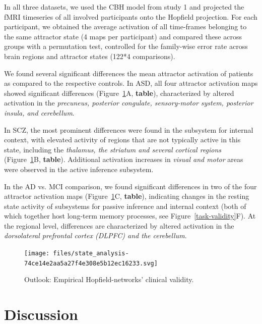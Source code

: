 \documentclass{article}
\begin{document}
In all three datasets, we used the CBH model from study 1 and projected the fMRI timeseries of all involved participants onto the Hopfield projection. For each participant, we obtained the average activation of all time-frames belonging to the same attractor state (4 maps per participant) and compared these across groups with a permutation test, controlled for the family-wise error rate across brain regions and attractor states (122*4 comparisons).

We found several significant differences the mean attractor activation of patients as compared to the respective controls. In ASD, all four attractor activation maps showed significant differences (Figure~\ref{clinical-validity}A, \textbf{table}), characterized by altered activation in the \textit{precuneus, posterior congulate, sensory-motor system, posterior insula, and cerebellum}.

In SCZ, the most prominent differences were found in the subsystem for internal context, with elevated activity of regions that are not typically active in this state, including the \textit{thalamus, the striatum and several cortical regions} (Figure~\ref{clinical-validity}B, \textbf{table}). Additional activation increases in \textit{visual and motor} areas were observed in the active inference subsystem.

In the AD vs. MCI comparison, we found significant differences in two of the four attractor activation maps (Figure~\ref{clinical-validity}C, \textbf{table}), indicating changes in the resting state activity of subsystems for passive inference and internal context (both of which together host long-term memory processes, see Figure~\ref{task-validity}F). At the regional level, differences are characterized by altered activation in the \textit{dorsolateral prefrontal cortex (DLPFC) and the cerebellum}.

\begin{figure}[!htbp]
\centering
\texttt{[image: files/state\_analysis-74ce14e2aa5a27f4e308e5b12ec16233.svg]}
\caption[]{Outlook: Empirical Hopfield-networks' clinical validity.}
\label{clinical-validity}
\end{figure}

\section{Discussion}\label{Discussion}
\end{document}
